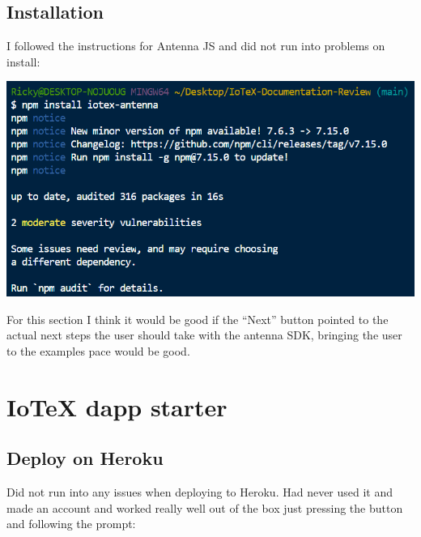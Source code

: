\documentclass[
]{book}
\begin{document}
\hypertarget{installation}{%
\section{Installation}\label{installation}}

I followed the instructions for Antenna JS and did not run into problems
on install:

\includegraphics{images/install_antenna.PNG}

For this section I think it would be good if the ``Next'' button pointed
to the actual next steps the user should take with the antenna SDK,
bringing the user to the examples pace would be good.

\hypertarget{iotex-dapp-starter}{%
\chapter{IoTeX dapp starter}\label{iotex-dapp-starter}}

\hypertarget{deploy-on-heroku}{%
\section{Deploy on Heroku}\label{deploy-on-heroku}}

Did not run into any issues when deploying to Heroku. Had never used it
and made an account and worked really well out of the box just pressing
the button and following the prompt:
\end{document}
